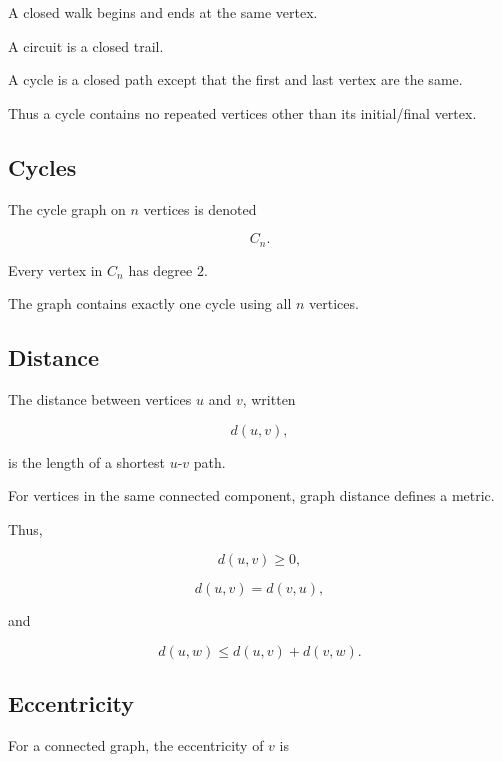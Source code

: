A closed walk begins and ends at the same vertex.

A circuit is a closed trail.

A cycle is a closed path except that the first and last vertex are the
same.

Thus a cycle contains no repeated vertices other than its initial/final
vertex.

\subsection{Cycles}
\label{subsec:graph-cycles}

The cycle graph on \(n\) vertices is denoted

\[
\boxed{
C_n.
}
\]

Every vertex in \(C_n\) has degree \(2\).

The graph contains exactly one cycle using all \(n\) vertices.

\subsection{Distance}
\label{subsec:graph-distance}

The distance between vertices \(u\) and \(v\), written

\[
\boxed{
d(u,v),
}
\]

is the length of a shortest \(u\)-\(v\) path.

For vertices in the same connected component, graph distance defines a
metric.

Thus,

\[
d(u,v)\geq0,
\]

\[
d(u,v)=d(v,u),
\]

and

\[
d(u,w)\leq d(u,v)+d(v,w).
\]

\subsection{Eccentricity}
\label{subsec:graph-eccentricity}

For a connected graph, the eccentricity of \(v\) is

